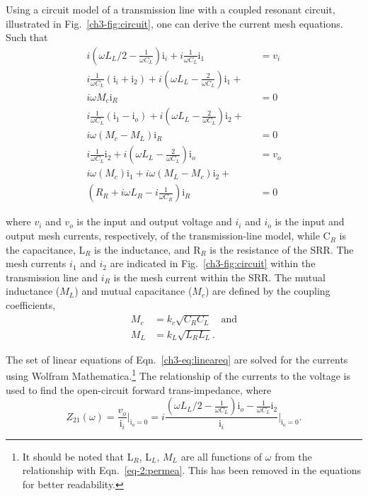 Using a circuit model of a transmission line with a coupled resonant circuit, illustrated in Fig.~\ref{ch3-fig:circuit}, one can derive the current mesh equations. Such that
\begin{subequations}
\begin{eqnarray}
i(\omega L_L/2 - \frac{1}{\omega C_L}) \text{i}_i +  i\frac{1}{\omega C_L} \text{i}_1 &= v_i  \\
i\frac{1}{\omega C_L} (\text{i}_{i}+\text{i}_2) + i(\omega L_L - \frac{2}{\omega C_L}) \text{i}_{1} + \nonumber \\
 i \omega M_c \text{i}_R &= 0  \\
i\frac{1}{\omega C_L} (\text{i}_{1}-\text{i}_{o}) + i(\omega L_L - \frac{2}{\omega C_L}) \text{i}_{2} + \nonumber \\
i \omega (M_c - M_L) \text{i}_R &= 0  \\
i \frac{1}{\omega C_L} \text{i}_{2} + i(\omega L_L - \frac{2}{\omega C_L}) \text{i}_{o}  &= v_o  \\
i \omega (M_c) \text{i}_{1} + i \omega (M_L - M_c)\text{i}_2 + \qquad \nonumber \\ 
(R_R + i \omega L_R - i\frac{1}{\omega C_R}) \text{i}_R  &= 0
\end{eqnarray}\label{ch3-eq:lineareq}
\end{subequations}

\noindent 
where $v_i$ and $v_o$ is the input and output voltage and $i_i$ and $i_o$ is the input and output mesh currents, respectively, of the transmission-line model, while C$_R$ is the capacitance, L$_R$ is the inductance, and R$_R$ is the resistance of the SRR. The mesh currents $i_1$ and $i_2$ are indicated in Fig.~\ref{ch3-fig:circuit} within the transmission line and $i_R$ is the mesh current within the SRR. The mutual inductance ($M_L$) and mutual capacitance ($M_c$) are defined by the coupling coefficients, 
\begin{subequations}
\begin{eqnarray}
    M_c &= k_c \sqrt{C_R C_L}\quad \text{and} \\
    M_L &= k_L \sqrt{L_R L_L}.
\end{eqnarray}
\end{subequations}

The set of linear equations of Eqn.~\ref{ch3-eq:lineareq} are solved for the currents using Wolfram Mathematica.\footnote{It should be noted that L$_R$, L$_L$, $M_L$ are all functions of $\omega$ from the relationship with Eqn.~\ref{eq-2:permea}. This has been removed in the equations for better readability.} The relationship of the currents to the voltage is used to find the open-circuit forward trans-impedance, where
\begin{equation}
    Z_{21}(\omega) = \frac{v_o}{\text{i}_i} \Biggr\rvert_{\text{i}_o=0} =i \frac{(\omega L_L/2 - \frac{1}{\omega C_L}) \text{i}_o - \frac{1}{\omega C_L} \text{i}_2  }{\text{i}_i} \Biggr\rvert_{\text{i}_o=0}.
\end{equation}

